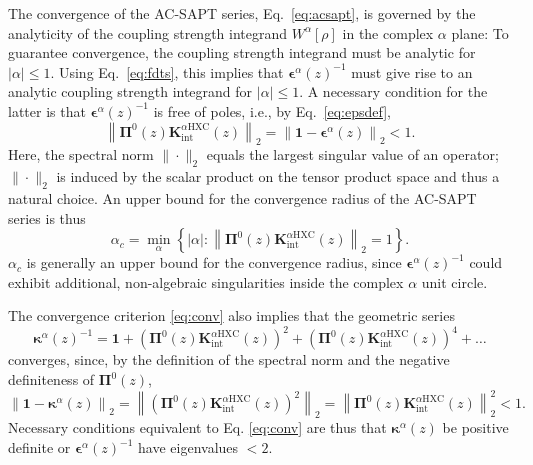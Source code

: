 \documentclass[journal=jctcce,manuscript=article]{achemso}
\begin{document}
The convergence of the AC-SAPT series, Eq.~\eqref{eq:acsapt}, is governed by
the analyticity of the coupling strength 
integrand $W^\alpha[\rho]$ in the complex $\alpha$ plane: To
guarantee convergence, the 
coupling strength integrand must be analytic for $|\alpha| \le
1$. Using Eq.~\eqref{eq:fdts}, this implies that
$\boldsymbol{\epsilon}^\alpha(z)^{-1}$ must give rise to an analytic
coupling strength integrand for $|\alpha| \le
1$. A necessary condition for the latter is that
$\boldsymbol{\epsilon}^\alpha(z)^{-1}$ is free of poles, i.e., by
Eq.~\eqref{eq:epsdef},
\begin{equation}
  \label{eq:conv}
  \left\| \boldsymbol{\Pi}^0(z) \mathbf{K}^{\alpha\text{HXC}}_\text{int}(z)
    \right\|_2 = \left\| \mathbf{1} -
    \boldsymbol{\epsilon}^\alpha(z) \right\|_2 < 1. 
\end{equation}
Here, the spectral norm $\|\cdot\|_2$ equals the largest singular value
of an operator; $\|\cdot\|_2$ is induced by the scalar product on the
tensor product space and thus a natural choice. An upper bound for the
convergence radius of the AC-SAPT series is thus
\begin{equation}
  \label{eq:alphac}
  \alpha_c = \min_{\alpha}\left\{ |\alpha| : \left\| 
        \boldsymbol{\Pi}^0(z)
        \mathbf{K}^{\alpha\text{HXC}}_\text{int}(z) 
    \right\|_2 = 1
    \right\}.
\end{equation}
$\alpha_c$ is generally an upper bound for the convergence radius, since
$\boldsymbol{\epsilon}^\alpha(z)^{-1}$ could exhibit additional,
non-algebraic singularities inside the complex $\alpha$ unit
circle.

The convergence criterion \eqref{eq:conv} also implies that the
geometric series 
\begin{equation}
  \label{eq:giptgen}
  \boldsymbol{\kappa}^\alpha(z)^{-1} = \mathbf{1} +
  \left(\boldsymbol{\Pi}^0(z)
  \mathbf{K}^{\alpha\text{HXC}}_\text{int}(z) \right)^2 +
  \left(\boldsymbol{\Pi}^0(z)
  \mathbf{K}^{\alpha\text{HXC}}_\text{int}(z) \right)^4 + \ldots
\end{equation}
converges, since, by the definition of the spectral norm and the
negative definiteness of $\boldsymbol{\Pi}^0(z)$,
\begin{equation}
  \label{eq:convgen}
  \left\| \mathbf{1} -
    \boldsymbol{\kappa}^\alpha(z) \right\|_2 = \left\| \left(
      \boldsymbol{\Pi}^0(z) \mathbf{K}^{\alpha\text{HXC}}_\text{int}(z)
    \right)^2 \right\|_2 =  \left\| 
      \boldsymbol{\Pi}^0(z) \mathbf{K}^{\alpha\text{HXC}}_\text{int}(z)
     \right\|_2^2 < 1. 
\end{equation}
Necessary conditions equivalent to Eq. \eqref{eq:conv} are thus that
$\boldsymbol{\kappa}^\alpha(z)$ be positive definite or 
$\boldsymbol{\epsilon}^\alpha(z)^{-1}$ have eigenvalues $<2$.
\end{document}
